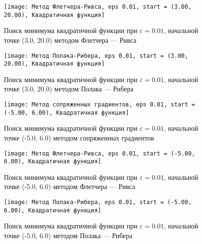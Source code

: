             \begin{figure}[H]
	        \centering
	        \texttt{[image: Метод Флетчера-Ривса, eps 0.01, start = (3.00, 20.00), Квадратичная функция]}%
	        \caption{Поиск минимума квадратичной функции при $\varepsilon = 0.01$, начальной точке (3.0, 20.0) методом Флетчера --- Ривса}
	        \vspace*{-1.2cm}
            \end{figure}
            
            \begin{figure}[H]
	        \centering
	        \texttt{[image: Метод Полака-Рибера, eps 0.01, start = (3.00, 20.00), Квадратичная функция]}%
	        \caption{Поиск минимума квадратичной функции при $\varepsilon = 0.01$, начальной точке (3.0, 20.0) методом Полака --- Рибера}
	        \vspace*{-1.2cm}
            \end{figure}
            
            \begin{figure}[H]
	        \centering
	        \texttt{[image: Метод сопряженных градиентов, eps 0.01, start = (-5.00, 6.00), Квадратичная функция]}%
	        \caption{Поиск минимума квадратичной функции при $\varepsilon = 0.01$, начальной точке (-5.0, 6.0) методом сопряженных градиентов}
	        \vspace*{-1.2cm}
            \end{figure}
            
            \begin{figure}[H]
	        \centering
	        \texttt{[image: Метод Флетчера-Ривса, eps 0.01, start = (-5.00, 6.00), Квадратичная функция]}%
	        \caption{Поиск минимума квадратичной функции при $\varepsilon = 0.01$, начальной точке (-5.0, 6.0) методом Флетчера --- Ривса}
	        \vspace*{-1.2cm}
            \end{figure}
            
            \begin{figure}[H]
	        \centering
	        \texttt{[image: Метод Полака-Рибера, eps 0.01, start = (-5.00, 6.00), Квадратичная функция]}%
	        \caption{Поиск минимума квадратичной функции при $\varepsilon = 0.01$, начальной точке (-5.0, 6.0) методом Полака --- Рибера}
	        \vspace*{-1.2cm}
            \end{figure}
            
